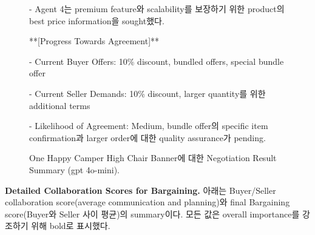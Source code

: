 \begin{figure}[htbp]
\begin{tcolorbox}[colback=orange!2!white, colframe=gray!50!orange]
\begin{minipage}{\linewidth}
- Agent 4는 premium feature와 scalability를 보장하기 위한 product의 best price information을 sought했다.

**[Progress Towards Agreement]**

- Current Buyer Offers: 10\% discount, bundled offers, special bundle offer

- Current Seller Demands: 10\% discount, larger quantity를 위한 additional terms

- Likelihood of Agreement: Medium, bundle offer의 specific item confirmation과 larger order에 대한 quality assurance가 pending.


\end{minipage}
\end{tcolorbox}
\caption{One Happy Camper High Chair Banner에 대한 Negotiation Result Summary (gpt 4o-mini).}
\label{fig:negotiation-summary}
\end{figure}
\noindent
\textbf{Detailed Collaboration Scores for Bargaining.} 아래는 Buyer/Seller collaboration score(average communication and planning)와 final Bargaining score(Buyer와 Seller 사이 평균)의 summary이다. 모든 값은 overall importance를 강조하기 위해 bold로 표시했다.

\begin{table}[htbp]
\centering
{}
\caption{각 model에 대한 Buyer 및 Seller detailed score(Communication, Planning, Collab average)와 Final Bargaining Score.}
\label{tab:appendix_bargaining_full}
\end{table}

